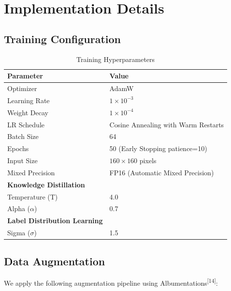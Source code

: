 \documentclass[12pt,a4paper]{article}
\begin{document}
\section{Implementation Details}

\subsection{Training Configuration}

\begin{table}[H]
\centering
\caption{Training Hyperparameters}
\begin{tabular}{ll}
\toprule
\textbf{Parameter} & \textbf{Value} \\
\midrule
Optimizer & AdamW \\
Learning Rate & $1 \times 10^{-3}$ \\
Weight Decay & $1 \times 10^{-4}$ \\
LR Schedule & Cosine Annealing with Warm Restarts \\
Batch Size & 64 \\
Epochs & 50 (Early Stopping patience=10) \\
Input Size & $160 \times 160$ pixels \\
Mixed Precision & FP16 (Automatic Mixed Precision) \\
\midrule
\textbf{Knowledge Distillation} & \\
Temperature (T) & 4.0 \\
Alpha ($\alpha$) & 0.7 \\
\midrule
\textbf{Label Distribution Learning} & \\
Sigma ($\sigma$) & 1.5 \\
\bottomrule
\end{tabular}
\end{table}

\subsection{Data Augmentation}

We apply the following augmentation pipeline using Albumentations\textsuperscript{[14]}:
\end{document}
